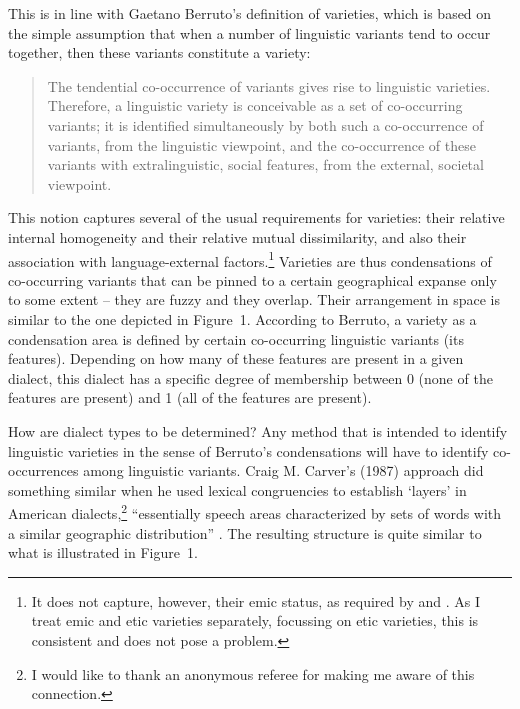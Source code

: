 \documentclass[output=paper]{LSP/langsci}
\begin{document}
This is in line with Gaetano Berruto’s definition of varieties, which is based on the simple assumption that when a number of linguistic variants tend to occur together, then these variants constitute a variety:

\begin{quote}
The tendential co-occurrence of variants gives rise to linguistic varieties. Therefore, a linguistic variety is conceivable as a set of co-occurring variants; it is identified simultaneously by both such a co-occurrence of variants, from the linguistic viewpoint, and the co-occurrence of these variants with extralinguistic, social features, from the external, societal viewpoint.\\
\citep[229]{auer_identifying_2010}
\end{quote}

This notion captures several of the usual requirements for varieties: their relative internal homogeneity and their relative mutual dissimilarity, and also their association with language-external factors.\footnote{   It does not capture, however, their emic status, as required by \citet[99]{auer_konversationelle_1986} and \citet[389--390]{lenz_struktur_2003}. As I treat emic and etic varieties separately, focussing on etic varieties, this is consistent and does not pose a problem.} Varieties are thus condensations of co-occurring variants that can be pinned to a certain geographical expanse only to some extent – they are fuzzy and they overlap. Their arrangement in space is similar to the one depicted in Figure~1. According to Berruto, a variety as a condensation area is defined by certain co-occurring linguistic variants (its features). Depending on how many of these features are present in a given dialect, this dialect has a specific degree of membership between 0 (none of the features are present) and 1 (all of the features are present).

How are dialect types to be determined? Any method that is intended to identify linguistic varieties in the sense of Berruto’s condensations will have to identify co-occurrences among linguistic variants. Craig M. Carver’s (1987) %
approach did something similar when he used lexical congruencies to establish ‘layers’ in American dialects,\footnote{I would like to thank an anonymous referee for making me aware of this connection.} “essentially speech areas characterized by sets of words with a similar geographic distribution” \citep[24]{boberg_north_2005}. The resulting structure is quite similar to what is illustrated in Figure~1. 
\end{document}
